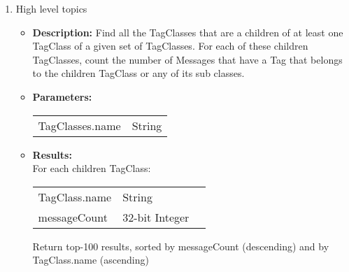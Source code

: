 {\begin{enumerate}
            \item High level topics
            \begin{itemize}
                \item \textbf{Description:}
                  Find all the TagClasses that are a children of at least one TagClass of a given set of TagClasses. For each of these
                  children TagClasses, count the number of Messages that have a Tag that belongs to the children TagClass or any of its
                  sub classes.
                \item \textbf{Parameters:} \\
                    \begin{tabular}{ll}
                      TagClasses.name & {String} \\
                    \end{tabular}
                \item \textbf{Results:} \\
                  For each children TagClass:
                    \begin{tabular}{lll}
                      TagClass.name & String & \\
                      messageCount & 32-bit Integer & \\
                    \end{tabular}
                    Return top-100 results, sorted by messageCount (descending) and by TagClass.name (ascending)
                    \end{itemize}


\end{enumerate}}
